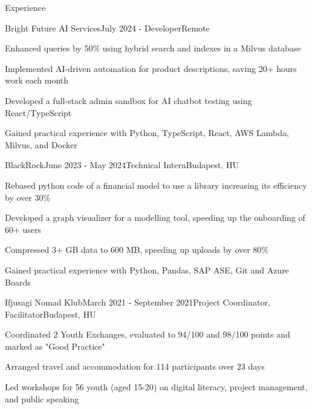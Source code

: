 \documentclass[
	a4paper, %
	11pt, %
]{resume} %
\begin{document}

\begin{rSection}{Experience}

	\begin{rSubsection}{Bright Future AI Services}{July 2024 - }{Developer}{Remote}
		\item Enhanced queries by 50\% using hybrid search and indexes in a Milvus database
		\item Implemented AI-driven automation for product descriptions, saving 20+ hours work each month
		\item Developed a full-stack admin sandbox for AI chatbot testing using React/TypeScript
		\item Gained practical experience with Python, TypeScript, React, AWS Lambda, Milvus, and Docker
	\end{rSubsection}

	\begin{rSubsection}{BlackRock}{June 2023 - May 2024}{Technical Intern}{Budapest, HU}
		\item Rebased python code of a financial model to use a library increasing its efficiency by over 30\%
		\item Developed a graph visualizer for a modelling tool, speeding up the onboarding of 60+ users
		\item Compressed 3+ GB data to 600 MB, speeding up uploads by over 80\%
		\item Gained practical experience with Python, Pandas, SAP ASE, Git and Azure Boards
	\end{rSubsection}

	\begin{rSubsection}{Ifjusagi Nomad Klub}{March 2021 - September 2021}{Project Coordinator, Facilitator}{Budapest, HU}
		\item Coordinated 2 Youth Exchanges, evaluated to 94/100 and 98/100 points and marked as "Good Practice"
		\item Arranged travel and accommodation for 114 participants over 23 days
		\item Led workshops for 56 youth (aged 15-20) on digital literacy, project management, and public speaking
	\end{rSubsection}

\end{rSection}
\end{document}
